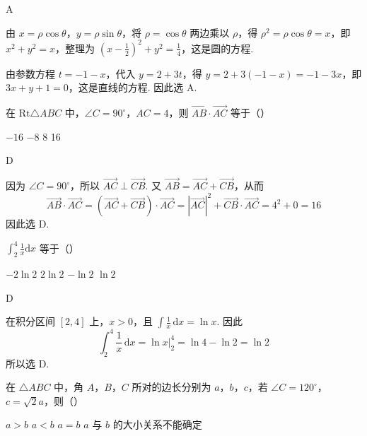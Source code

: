 \begin{answer}
A
\end{answer}

\begin{solution}
由 \(x=\rho\cos\theta\)，\(y=\rho\sin\theta\)，将 \(\rho=\cos\theta\) 两边乘以 \(\rho\)，得
\(\rho^2=\rho\cos\theta=x\)，即
\(x^2+y^2=x\)，整理为
\(\left(x-\frac12\right)^2+y^2=\frac14\)，这是圆的方程.

由参数方程 \(t=-1-x\)，代入 \(y=2+3t\)，得
\(y=2+3(-1-x)=-1-3x\)，即 \(3x+y+1=0\)，这是直线的方程. 因此选 A.
\end{solution}

\begin{problem}
在 \(\mathrm{Rt}\triangle ABC\) 中，\(\angle C = 90^{\circ}\)，\(AC = 4\)，则 \( \overrightarrow{AB} \cdot \overrightarrow{AC} \) 等于（\quad）

\choices
    {\(-16\)}
    {\(-8\)}
    {8}
    {16}
\end{problem}

\begin{answer}
D
\end{answer}

\begin{solution}
因为 \(\angle C=90^{\circ}\)，所以 \(\overrightarrow{AC}\perp\overrightarrow{CB}\). 又
\(\overrightarrow{AB}=\overrightarrow{AC}+\overrightarrow{CB}\)，从而
\[
\overrightarrow{AB}\cdot\overrightarrow{AC}
=(\overrightarrow{AC}+\overrightarrow{CB})\cdot\overrightarrow{AC}
=|\overrightarrow{AC}|^2+\overrightarrow{CB}\cdot\overrightarrow{AC}
=4^2+0=16
\]
因此选 D.
\end{solution}

\begin{problem}
\(\int_2^4 \frac{1}{x} \mathrm{d}x\) 等于（\quad）

\choices
    {\(-2\ln 2\)}
    {\(2\ln 2\)}
    {\(-\ln 2\)}
    {\(\ln 2\)}
\end{problem}

\begin{answer}
D
\end{answer}

\begin{solution}
在积分区间 \([2,4]\) 上，\(x>0\)，且 \(\displaystyle\int\frac{1}{x}\,\mathrm{d}x=\ln x\). 因此
\[
\int_2^4\frac{1}{x}\,\mathrm{d}x
=\left.\ln x\right|_2^4
=\ln4-\ln2
=\ln2
\]
所以选 D.
\end{solution}

\begin{problem}
在 \(\triangle ABC\) 中，角 \(A\)，\(B\)，\(C\) 所对的边长分别为 \(a\)，\(b\)，\(c\)，若 \(\angle C = 120^{\circ}\)，\(c = \sqrt{2} a\)，则（\quad）

\choices
    {\(a > b\)}
    {\(a < b\)}
    {\(a = b\)}
    {\(a\) 与 \(b\) 的大小关系不能确定}
\end{problem}

